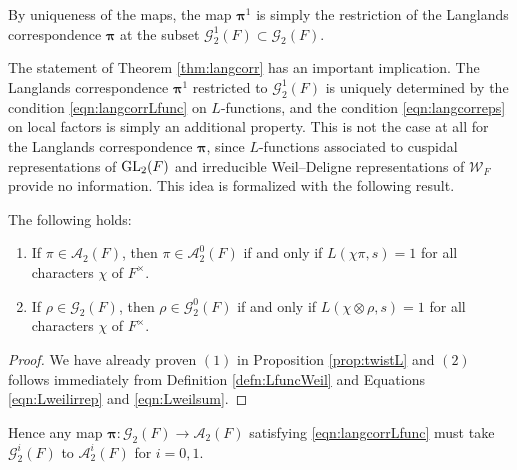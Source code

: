 By uniqueness of the maps, the map $\bm\pi^1$ is simply the restriction of the Langlands correspondence $\bm\pi$ at the subset $\mathcal{G}_2^1(F)\subset\mathcal{G}_2(F)$. 

\begin{rem}\label{rem:deligne}
    The statement of Theorem \ref{thm:langcorr} has an important implication. The Langlands correspondence $\bm\pi^1$ restricted to $\mathcal{G}_2^1(F)$ is uniquely determined by the condition \eqref{eqn:langcorrLfunc} on $L$-functions, and the condition \eqref{eqn:langcorreps} on local factors is simply an additional property. This is not the case at all for the Langlands correspondence $\bm\pi$, since $L$-functions associated to cuspidal representations of $\mathrm{GL}_2(F)$ and irreducible Weil--Deligne representations of $\mathcal{W}_F$ provide no information. This idea is formalized with the following result.
    \begin{prop}
        The following holds:
        \begin{enumerate}[(1)]
            \item If $\pi\in\mathcal{A}_2(F)$, then $\pi\in\mathcal{A}_2^0(F)$ if and only if $L(\chi\pi,s)=1$ for all characters $\chi$ of $F^\times$.
            \item If $\rho\in\mathcal{G}_2(F)$, then $\rho\in\mathcal{G}_2^0(F)$ if and only if $L(\chi\otimes\rho,s)=1$ for all characters $\chi$ of $F^\times$.
        \end{enumerate}
    \end{prop}
    \begin{proof}
        We have already proven $(1)$ in Proposition \ref*{prop:twistL} and $(2)$ follows immediately from Definition \ref{defn:LfuncWeil} and Equations \eqref{eqn:Lweilirrep} and \eqref{eqn:Lweilsum}.
    \end{proof}
    Hence any map $\bm\pi:\mathcal{G}_2(F)\longrightarrow\mathcal{A}_2(F)$ satisfying \eqref{eqn:langcorrLfunc} must take $\mathcal{G}_2^i(F)$ to $\mathcal{A}^i_2(F)$ for $i=0,1$. 
\end{rem}

